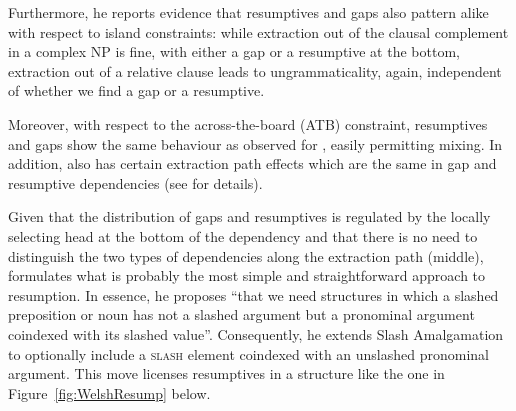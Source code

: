 \documentclass[output=paper
,notxmath 
 	        ,biblatex
                ,babelshorthands
                ,newtxmath
                ,draftmode
                ,colorlinks, citecolor=brown
]{langscibook}
\begin{document}
Furthermore, he reports evidence that resumptives and gaps also
pattern alike with respect to island constraints: while extraction out
of the clausal complement in a complex NP is fine, with either a gap
or a resumptive at the bottom, extraction out of a relative clause leads to
ungrammaticality, again, independent of whether we find a gap or a
resumptive.

\eal
{}
\zl

\noindent
Moreover, with respect to the across-the-board (ATB) constraint,
resumptives and gaps show the same behaviour as observed for ,
easily permitting mixing. In addition,  also has certain
extraction path effects which are the same in gap and resumptive
dependencies (see \citealp{Borsley.2010} for details).

Given that the distribution of gaps and resumptives is regulated by
the locally selecting head at the bottom of the dependency and that
there is no need to distinguish the two types of dependencies along
the extraction path (middle), \citet[97]{Borsley.2010} formulates what is
probably the most simple and straightforward approach to
resumption. In essence, he proposes ``that we need structures in which
a slashed preposition or noun has not a slashed argument but a
pronominal argument coindexed with its slashed value''. Consequently,
he extends Slash Amalgamation to optionally include a
\textsc{slash} element coindexed with an unslashed pronominal
argument. This move licenses  resumptives in a structure like the
one in Figure~\ref{fig:WelshResump} below.
\end{document}
